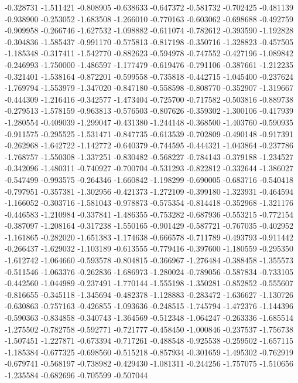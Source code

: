 -0.328731
-1.511421
-0.808905
-0.638633
-0.647372
-0.581732
-0.702425
-0.481139
-0.938900
-0.253052
-1.683508
-1.266010
-0.770163
-0.603062
-0.698688
-0.492759
-0.909958
-0.266746
-1.627532
-1.098882
-0.611074
-0.782612
-0.393590
-1.192828
-0.304836
-1.585437
-0.991170
-0.575813
-0.817198
-0.350716
-1.328823
-0.457505
-1.185348
-0.317411
-1.542770
-0.882623
-0.594978
-0.747552
-0.427196
-1.089842
-0.246993
-1.750000
-1.486597
-1.177479
-0.619476
-0.791106
-0.387661
-1.212235
-0.321401
-1.538164
-0.872201
-0.599558
-0.735818
-0.442715
-1.045400
-0.237624
-1.769794
-1.553979
-1.347020
-0.847180
-0.558598
-0.808770
-0.352907
-1.319667
-0.444309
-1.216416
-0.342577
-1.473404
-0.725700
-0.717582
-0.503816
-0.889738
-0.279513
-1.578159
-0.963813
-0.576503
-0.807626
-0.359302
-1.300106
-0.417939
-1.280554
-0.409039
-1.299047
-0.431380
-1.244148
-0.368500
-1.403760
-0.590935
-0.911575
-0.295525
-1.531471
-0.847735
-0.613539
-0.702809
-0.490148
-0.917391
-0.262968
-1.642722
-1.142772
-0.640379
-0.744595
-0.444321
-1.043864
-0.237786
-1.768757
-1.550308
-1.337251
-0.830482
-0.568227
-0.784143
-0.379188
-1.234527
-0.342096
-1.480311
-0.740927
-0.700704
-0.531293
-0.822812
-0.332644
-1.386027
-0.547499
-0.993575
-0.264346
-1.660842
-1.198299
-0.690005
-0.683716
-0.540418
-0.797951
-0.357381
-1.302956
-0.421373
-1.272109
-0.399180
-1.323931
-0.464594
-1.166052
-0.303716
-1.581043
-0.978873
-0.575354
-0.814418
-0.352968
-1.321176
-0.446583
-1.210984
-0.337841
-1.486355
-0.753282
-0.687936
-0.553215
-0.772154
-0.387097
-1.208164
-0.317238
-1.550165
-0.901429
-0.587721
-0.767035
-0.402952
-1.161865
-0.282020
-1.651383
-1.174638
-0.666578
-0.711789
-0.493793
-0.911442
-0.266437
-1.629032
-1.103189
-0.613555
-0.779416
-0.397600
-1.180559
-0.295350
-1.612742
-1.064660
-0.593578
-0.804815
-0.366967
-1.276484
-0.388458
-1.355573
-0.511546
-1.063376
-0.262836
-1.686973
-1.280024
-0.789056
-0.587834
-0.733105
-0.442560
-1.044989
-0.237491
-1.770144
-1.555198
-1.350281
-0.852852
-0.555607
-0.816655
-0.345118
-1.345694
-0.482378
-1.128883
-0.283472
-1.636627
-1.130726
-0.630863
-0.757163
-0.426855
-1.093636
-0.248515
-1.745794
-1.472376
-1.144396
-0.590363
-0.834858
-0.340743
-1.364569
-0.512348
-1.064247
-0.263336
-1.685514
-1.275502
-0.782758
-0.592771
-0.721777
-0.458450
-1.000846
-0.237537
-1.756738
-1.507451
-1.227871
-0.673394
-0.717261
-0.488548
-0.925538
-0.259502
-1.657115
-1.185384
-0.677325
-0.698560
-0.515218
-0.857934
-0.301659
-1.495302
-0.762919
-0.679741
-0.568197
-0.738982
-0.429430
-1.081311
-0.244256
-1.757075
-1.510656
-1.235584
-0.682696
-0.705599
-0.507044
